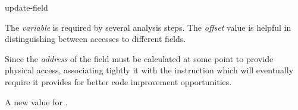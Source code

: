 \begin{instruction}{update-field}

  \begin{notes}
    The \emph{variable} is required by several analysis steps.  The
    \emph{offset} value is helpful in distinguishing between accesses
    to different fields.

    Since the \emph{address} of the field must be calculated at some
    point to provide physical access, associating tightly it with the
    instruction which will eventually require it provides for better
    code improvement opportunities.
  \end{notes}

  \begin{results}
  \item A new value for .
  \end{results}

  \begin{operands}
  \item {}
  \item {}
  \item {}
  \item {}
  \end{operands}

  \begin{seealso}
  \end{seealso}
\end{instruction}

